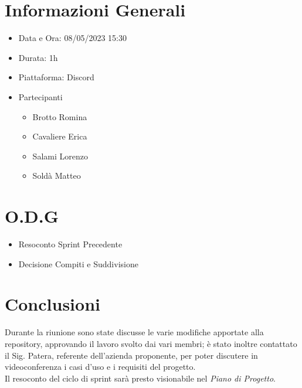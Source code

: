 \documentclass[a4paper, 12pt]{article}
\begin{document}
\makefrontpage

\section*{Informazioni Generali}
\begin{itemize}
    \item Data e Ora: 08/05/2023 15:30
    \item Durata: 1h
    \item Piattaforma: Discord
    \item Partecipanti
    \begin{itemize}
        \item Brotto Romina
        \item Cavaliere Erica
        \item Salami Lorenzo
        \item Soldà Matteo
    \end{itemize}
\end{itemize}

\section*{O.D.G}
\begin{itemize}
    \item Resoconto Sprint Precedente
    \item Decisione Compiti e Suddivisione
\end{itemize}

\section*{Conclusioni}
Durante la riunione sono state discusse le varie modifiche apportate alla repository, approvando il lavoro svolto dai vari membri; è stato inoltre contattato il Sig. Patera, referente dell'azienda proponente, per poter discutere in videoconferenza i casi d'uso e i requisiti del progetto.\\
Il resoconto del ciclo di sprint sarà presto visionabile nel \textit{Piano di Progetto}.\\
\end{document}
